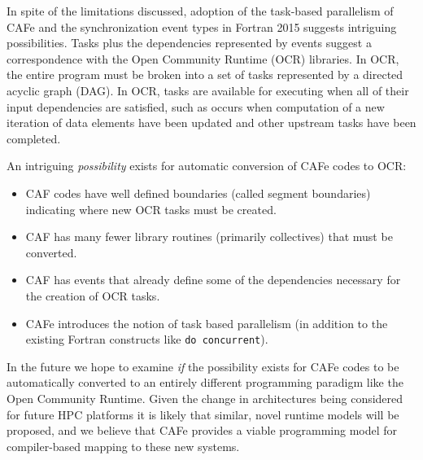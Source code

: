 In spite of the limitations discussed, 
adoption of the task-based parallelism of CAFe and the synchronization
event types in Fortran 2015 suggests intriguing possibilities.  Tasks plus the
dependencies represented by events suggest a correspondence with the Open Community
Runtime (OCR) libraries.  In OCR, the entire program must be broken into a set of tasks
represented by a directed acyclic graph (DAG).  In OCR, tasks are available for executing
when all of their input dependencies are satisfied, such as occurs when computation of a new
iteration of data elements have been updated and other upstream tasks have been completed.


An intriguing \emph{possibility} exists for automatic conversion of CAFe codes to OCR:
\begin{itemize}
\item
  CAF codes have well defined boundaries (called segment boundaries) indicating where new
  OCR tasks must be created.
\item
  CAF has many fewer library routines (primarily collectives) that must be converted.
\item
  CAF has events that already define some of the dependencies necessary for the creation
  of OCR tasks.
\item
  CAFe introduces the notion of task based parallelism (in addition to the existing
  Fortran constructs like \texttt{do concurrent}).
\end{itemize}

In the future we hope to examine \emph{if} the possibility exists for CAFe codes to be
automatically converted to an entirely different programming paradigm like
the Open Community Runtime.  Given the change in architectures being considered for
future HPC platforms it is likely that similar, novel runtime models will be proposed,
and we believe that CAFe provides a viable programming model for compiler-based mapping to
these new systems.


